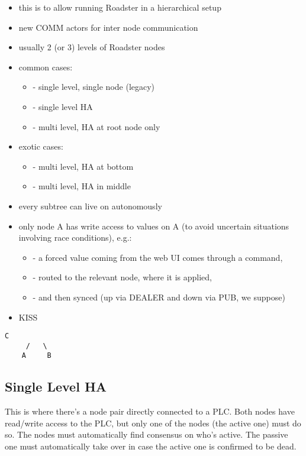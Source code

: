 \begin{itemize}
\item this is to allow running Roadster in a hierarchical setup
\item new COMM actors for inter node communication
\item usually 2 (or 3) levels of Roadster nodes
\item common cases:
\begin{itemize}
\item   - single level, single node (legacy)
\item   - single level HA
\item   - multi level, HA at root node only
\end{itemize}
\item exotic cases:
\begin{itemize}
\item   - multi level, HA at bottom
\item   - multi level, HA in middle
\end{itemize}
\item every subtree can live on autonomously
\item only node A has write access to values on A (to avoid uncertain situations involving race conditions), e.g.:
\begin{itemize}
\item - a forced value coming from the web UI comes through a command,
\item - routed to the relevant node, where it is applied,
\item - and then synced (up via DEALER and down via PUB, we suppose)
\end{itemize}
\item KISS
\end{itemize}


\begin{lstlisting}[style=customsh]
       C
     /   \
    A     B
\end{lstlisting}



\subsection{Single Level HA}
This is where there's a node pair directly connected to a PLC. Both nodes have read\slash write access to the PLC, but only one of the nodes (the active one) must do so. The nodes must automatically find consensus on who's active. The passive one must automatically take over in case the active one is confirmed to be dead.\\

